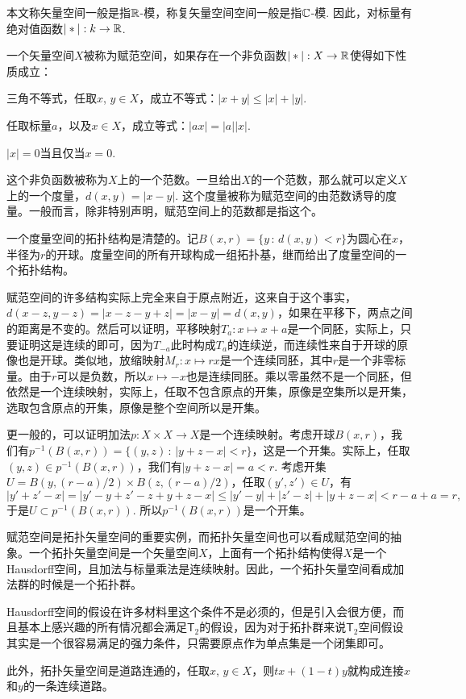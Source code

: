 本文称矢量空间一般是指$\mathbb{R}$-模，称复矢量空间空间一般是指$\mathbb{C}$-模. 因此，对标量有绝对值函数$|*|:k\to \mathbb{R}$.

\begin{para}
一个矢量空间$X$被称为赋范空间，如果存在一个非负函数$|*|:X\to \mathbb{R}$使得如下性质成立：
\begin{compactenum}
\item 三角不等式，任取$x$, $y\in X$，成立不等式：$|x+y|\leq |x|+|y|$.
\item 任取标量$a$，以及$x\in X$，成立等式：$|ax|=|a||x|$.
\item $|x|=0$当且仅当$x=0$.
\end{compactenum}
这个非负函数被称为$X$上的一个范数。一旦给出$X$的一个范数，那么就可以定义$X$上的一个度量，$d(x,y)=|x-y|$. 这个度量被称为赋范空间的由范数诱导的度量。一般而言，除非特别声明，赋范空间上的范数都是指这个。
\end{para}

\begin{para}
一个度量空间的拓扑结构是清楚的。记$B(x,r)=\{y\,:\, d(x,y)<r\}$为圆心在$x$，半径为$r$的开球。度量空间的所有开球构成一组拓扑基，继而给出了度量空间的一个拓扑结构。

赋范空间的许多结构实际上完全来自于原点附近，这来自于这个事实，$d(x-z,y-z)=|x-z-y+z|=|x-y|=d(x,y)$，如果在平移下，两点之间的距离是不变的。然后可以证明，平移映射$T_a:x\mapsto x+a$是一个同胚，实际上，只要证明这是连续的即可，因为$T_{-a}$此时构成$T_a$的连续逆，而连续性来自于开球的原像也是开球。类似地，放缩映射$M_r:x\mapsto rx$是一个连续同胚，其中$r$是一个非零标量。由于$r$可以是负数，所以$x\mapsto -x$也是连续同胚。乘以零虽然不是一个同胚，但依然是一个连续映射，实际上，任取不包含原点的开集，原像是空集所以是开集，选取包含原点的开集，原像是整个空间所以是开集。

更一般的，可以证明加法$p:X\times X\to X$是一个连续映射。考虑开球$B(x,r)$，我们有$p^{-1}(B(x,r))=\{(y,z)\,:\,|y+z-x|<r\}$，这是一个开集。实际上，任取$(y,z)\in p^{-1}(B(x,r))$，我们有$|y+z-x|=a<r$. 考虑开集$U=B(y,(r-a)/2)\times B(z,(r-a)/2)$，任取$(y',z')\in U$，有
\[
	|y'+z'-x|=\left|y'-y+z'-z+y+z-x\right|\leq |y'-y|+|z'-z|+|y+z-x|<r-a+a=r,
\]
于是$U\subset p^{-1}(B(x,r))$. 所以$p^{-1}(B(x,r))$是一个开集。
\end{para}

\begin{para}
赋范空间是拓扑矢量空间的重要实例，而拓扑矢量空间也可以看成赋范空间的抽象。一个拓扑矢量空间是一个矢量空间$X$，上面有一个拓扑结构使得$X$是一个Hausdorff空间，且加法与标量乘法是连续映射。因此，一个拓扑矢量空间看成加法群的时候是一个拓扑群。

Hausdorff空间的假设在许多材料里这个条件不是必须的，但是引入会很方便，而且基本上感兴趣的所有情况都会满足$\mathsf{T}_2$的假设，因为对于拓扑群来说$\mathsf{T}_2$空间假设其实是一个很容易满足的强力条件，只需要原点作为单点集是一个闭集即可。

此外，拓扑矢量空间是道路连通的，任取$x$, $y\in X$，则$tx+(1-t)y$就构成连接$x$和$y$的一条连续道路。
\end{para}

